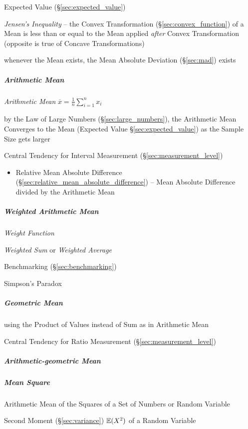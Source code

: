 \fist Expected Value (\S\ref{sec:expected_value})

\emph{Jensen's Inequality} -- the Convex Transformation
(\S\ref{sec:convex_function}) of a Mean is less than or equal to the Mean
applied \emph{after} Convex Transformation (opposite is true of Concave
Transformations)

whenever the Mean exists, the Mean Absolute Deviation (\S\ref{sec:mad}) exists



\subparagraph{Arithmetic Mean}\label{sec:arithmetic_mean}\hfill

\emph{Arithmetic Mean} $\overline{x} = \frac{1}{n}\sum_{i=1}^n x_i$

by the Law of Large Numbers (\S\ref{sec:large_numbers}), the Arithmetic Mean
Converges to the Mean (Expected Value \S\ref{sec:expected_value}) as the Sample
Size gets larger

Central Tendency for Interval Measurement (\S\ref{sec:measurement_level})

\begin{itemize}
  \item Relative Mean Absolute Difference
    (\S\ref{sec:relative_mean_absolute_difference}) -- Mean Absolute Difference
    divided by the Arithmetic Mean
\end{itemize}



\subparagraph{Weighted Arithmetic Mean}\label{sec:weighted_mean}\hfill

\emph{Weight Function}

\emph{Weighted Sum} or \emph{Weighted Average}

\fist Benchmarking (\S\ref{sec:benchmarking})

Simpson's Paradox



\subparagraph{Geometric Mean}\label{sec:geometric_mean}\hfill

using the Product of Values instead of Sum as in Arithmetic Mean

Central Tendency for Ratio Measurement (\S\ref{sec:measurement_level})



\subparagraph{Arithmetic-geometric Mean}\label{sec:arithmetic_geometric}\hfill

\subparagraph{Mean Square}\label{sec:mean_square}\hfill

Arithmetic Mean of the Squares of a Set of Numbers or Random Variable

Second Moment (\S\ref{sec:variance}) $\mathbb{E}(X^2)$ of a Random Variable

